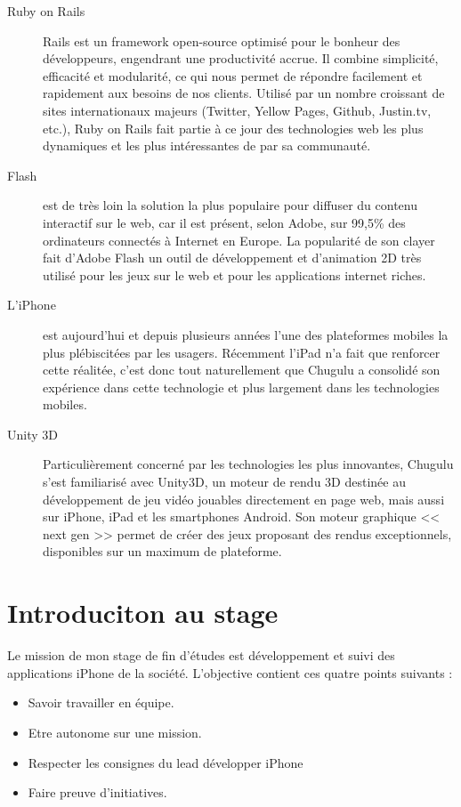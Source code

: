 \begin{description}  \item[Ruby on Rails] Rails est un framework open-source optimisé pour le bonheur des développeurs, engendrant une productivité accrue. Il combine simplicité, efficacité et modularité, ce qui nous permet de répondre facilement et rapidement aux besoins de nos clients. Utilisé par un nombre croissant de sites internationaux majeurs (Twitter, Yellow Pages, Github, Justin.tv, etc.), Ruby on Rails fait partie à ce jour des technologies web les plus dynamiques et les plus intéressantes de par sa communauté.

\item[Flash] est de très loin la solution la plus populaire pour diffuser du contenu interactif sur le web, car il est présent, selon Adobe, sur 99,5\% des ordinateurs connectés à Internet en Europe. La popularité de son clayer fait d’Adobe Flash un outil de développement et d’animation 2D très utilisé pour les jeux sur le web et pour les applications internet riches.

\item[L'iPhone] est aujourd'hui et depuis plusieurs années l'une des plateformes mobiles la plus plébiscitées par les usagers. Récemment l'iPad n'a fait que renforcer cette réalitée, c'est donc tout naturellement que Chugulu a consolidé son expérience dans cette technologie et plus largement dans les technologies mobiles.

\item[Unity 3D] Particulièrement concerné par les technologies les plus innovantes, Chugulu s’est familiarisé avec Unity3D, un moteur de rendu 3D destinée au développement de jeu vidéo jouables directement en page web, mais aussi sur iPhone, iPad et les smartphones Android. Son moteur graphique << next gen >> permet de créer des jeux proposant des rendus exceptionnels, disponibles sur un maximum de plateforme.
\end{description} %

\section{Introduciton au stage} %
Le mission de mon stage de fin d'études est développement et suivi des applications iPhone de la société. L'objective contient ces quatre points suivants : 

\begin{itemize}  \item Savoir travailler en équipe.

\item Etre autonome sur une mission.

\item Respecter les consignes du lead développer iPhone  \item Faire preuve d'initiatives.
\end{itemize}

